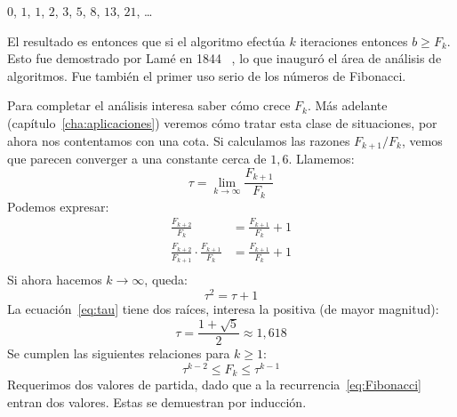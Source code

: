   \noindent
    \hspace{2.3em} \(0\), \(1\), \(1\), \(2\), \(3\), \(5\),
		   \(8\), \(13\), \(21\), \ldots

  \noindent
  El resultado es entonces
  que si el algoritmo efectúa \(k\) iteraciones
  entonces \(b \ge F_k\).
  Esto fue demostrado por Lamé en 1844~%
    \cite{lame44:_gcd},%
  lo que inauguró el área de análisis de algoritmos.%
  Fue también el primer uso serio de los números de Fibonacci.

  Para completar el análisis interesa saber cómo crece \(F_k\).
  Más adelante
  (capítulo~\ref{cha:aplicaciones})
  veremos cómo tratar esta clase de situaciones,
  por ahora nos contentamos con una cota.
  Si calculamos las razones \(F_{k + 1} / F_k\),
  vemos que parecen converger a una constante cerca de \(1,6\).
  Llamemos:
  \begin{equation*}
    \tau
      = \lim_{k \rightarrow \infty} \frac{F_{k + 1}}{F_k}
  \end{equation*}
  Podemos expresar:
  \begin{align*}
    \frac{F_{k + 2}}{F_k}
      &= \frac{F_{k + 1}}{F_k} + 1 \\
    \frac{F_{k + 2}}{F_{k + 1}} \cdot \frac{F_{k + 1}}{F_k}
      &= \frac{F_{k + 1}}{F_k} + 1 \\
  \end{align*}
  Si ahora hacemos \(k \rightarrow \infty\),
  queda:
  \begin{equation}
    \label{eq:tau}
    \tau^2
      = \tau + 1
  \end{equation}
  La ecuación~\eqref{eq:tau} tiene dos raíces,
  interesa la positiva
  (de mayor magnitud):
  \begin{equation*}
    \tau
      = \frac{1 + \sqrt{5}}{2}
      \approx 1,618
  \end{equation*}
  Se cumplen las siguientes relaciones para \(k \ge 1\):
  \begin{equation}
    \label{eq:cotas-Fk}
    \tau^{k - 2} \le F_k \le \tau^{k - 1}
  \end{equation}
  Requerimos dos valores de partida,
  dado que a la recurrencia~\eqref{eq:Fibonacci}
  entran dos valores.%
  Estas se demuestran por inducción.%
